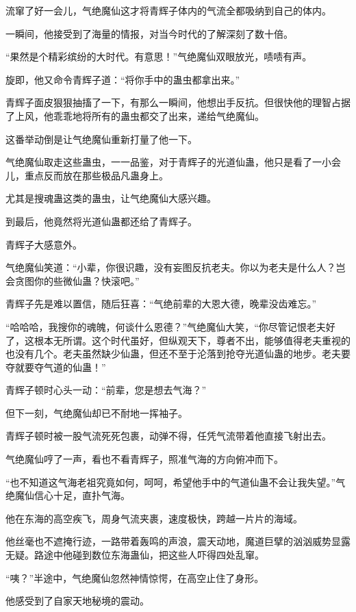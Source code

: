 \begin{this_body}
流窜了好一会儿，气绝魔仙这才将青辉子体内的气流全都吸纳到自己的体内。

一瞬间，他接受到了海量的情报，对当今时代的了解深刻了数十倍。

“果然是个精彩缤纷的大时代。有意思！”气绝魔仙双眼放光，啧啧有声。

旋即，他又命令青辉子道：“将你手中的蛊虫都拿出来。”

青辉子面皮狠狠抽搐了一下，有那么一瞬间，他想出手反抗。但很快他的理智占据了上风，他乖乖地将所有的蛊虫都交了出来，递给气绝魔仙。

这番举动倒是让气绝魔仙重新打量了他一下。

气绝魔仙取走这些蛊虫，一一品鉴，对于青辉子的光道仙蛊，他只是看了一小会儿，重点反而放在那些极品凡蛊身上。

尤其是搜魂蛊这类的蛊虫，让气绝魔仙大感兴趣。

到最后，他竟然将光道仙蛊都还给了青辉子。

青辉子大感意外。

气绝魔仙笑道：“小辈，你很识趣，没有妄图反抗老夫。你以为老夫是什么人？岂会贪图你的些微仙蛊？快滚吧。”

青辉子先是难以置信，随后狂喜：“气绝前辈的大恩大德，晚辈没齿难忘。”

“哈哈哈，我搜你的魂魄，何谈什么恩德？”气绝魔仙大笑，“你尽管记恨老夫好了，这根本无所谓。这个时代虽好，但纵观天下，尊者不出，能够值得老夫重视的也没有几个。老夫虽然缺少仙蛊，但还不至于沦落到抢夺光道仙蛊的地步。老夫要夺就要夺气道的仙蛊！”

青辉子顿时心头一动：“前辈，您是想去气海？”

但下一刻，气绝魔仙却已不耐地一挥袖子。

青辉子顿时被一股气流死死包裹，动弹不得，任凭气流带着他直接飞射出去。

气绝魔仙哼了一声，看也不看青辉子，照准气海的方向俯冲而下。

“也不知道这气海老祖究竟如何，呵呵，希望他手中的气道仙蛊不会让我失望。”气绝魔仙信心十足，直扑气海。

他在东海的高空疾飞，周身气流夹裹，速度极快，跨越一片片的海域。

他丝毫也不遮掩行迹，一路带着轰鸣的声浪，震天动地，魔道巨擘的汹汹威势显露无疑。路途中他碰到数位东海蛊仙，把这些人吓得四处乱窜。

“咦？”半途中，气绝魔仙忽然神情惊愕，在高空止住了身形。

他感受到了自家天地秘境的震动。


\end{this_body}
